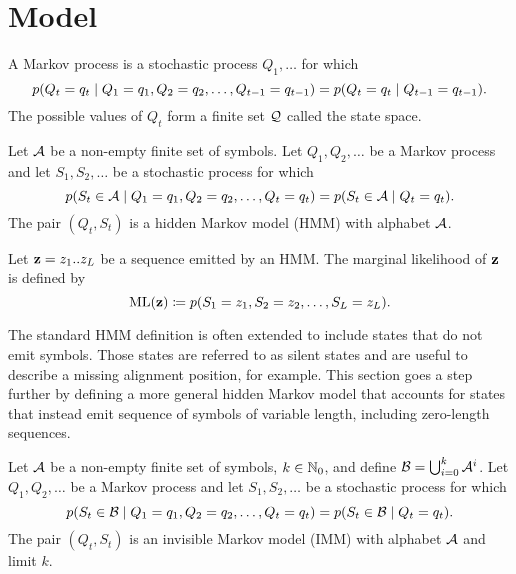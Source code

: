 \section{Model}

\begin{definition}\label{def:mp}
  A Markov process is a stochastic process $Q_1, \dots$ for which
  \begin{equation*}
    p(Q_t=q_t \;|\; Q_1=q_1, Q_2=q_2, \dots, Q_{t-1}=q_{t-1}) = p(Q_t=q_t \;|\; Q_{t-1}=q_{t-1}).
  \end{equation*}
  The possible values of $Q_t$ form a finite set $\mathcal{Q}$ called the state space.
\end{definition}

\begin{definition}\label{def:hmm}
  Let $\mathcal{A}$ be a non-empty finite set of symbols. Let $Q_1, Q_2, \dots$ be a Markov process and
  let $S_1, S_2, \dots$ be a stochastic process for which
  \begin{equation*}
    p(S_t\in\mathcal{A} \;|\; Q_1=q_1, Q_2=q_2, \dots, Q_t=q_t) = p(S_t\in\mathcal{A} \;|\; Q_t=q_t).
  \end{equation*}
  The pair $(Q_t, S_t)$ is a hidden Markov model (HMM) with alphabet $\mathcal{A}$.
\end{definition}

Let $\mathbf{z}=z_1 .. z_L$ be a sequence emitted by an HMM.\@
The marginal likelihood of $\mathbf{z}$ is defined by
\begin{equation}\label{eq:hml}
  \mathrm{ML}(\mathbf{z}) \coloneqq p(S_1=z_1, S_2=z_2, \dots, S_L=z_L).
\end{equation}

The standard HMM definition is often extended to include states that do not emit symbols. Those
states are referred to as silent states and are useful to describe a missing alignment position, for
example. This section goes a step further by defining a more general hidden Markov model that
accounts for states that instead emit sequence of symbols of variable length, including zero-length
sequences.

\begin{definition}
  Let $\mathcal{A}$ be a non-empty finite set of symbols, $k\in\mathbb{N}_0$, and define
  $\mathcal{B}=\bigcup_{i=0}^k\mathcal{A}^i$.
  Let $Q_1, Q_2, \dots$ be a Markov process and let $S_1, S_2, \dots$ be a stochastic process for
  which
  \begin{equation*}
    p(S_t\in\mathcal{B} \;|\; Q_1=q_1, Q_2=q_2, \dots, Q_t=q_t)
    = p(S_t\in\mathcal{B} \;|\; Q_t=q_t).
  \end{equation*}
  The pair $(Q_t, S_t)$ is an invisible Markov model (IMM) with alphabet $\mathcal{A}$ and
  limit $k$.
\end{definition}

